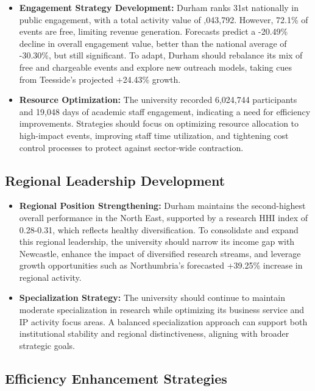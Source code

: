 \documentclass[journal,onecolumn, 10pt,draftclsnofoot]{IEEEtran}
\begin{document}
\begin{itemize}
    \item \textbf{Engagement Strategy Development:} Durham ranks 31st nationally in public engagement, with a total activity value of ,043,792. However, 72.1\% of events are free, limiting revenue generation. Forecasts predict a -20.49\% decline in overall engagement value, better than the national average of -30.30\%, but still significant. To adapt, Durham should rebalance its mix of free and chargeable events and explore new outreach models, taking cues from Teesside's projected +24.43\% growth.
    
    \item \textbf{Resource Optimization:} The university recorded 6,024,744 participants and 19,048 days of academic staff engagement, indicating a need for efficiency improvements. Strategies should focus on optimizing resource allocation to high-impact events, improving staff time utilization, and tightening cost control processes to protect against sector-wide contraction.
\end{itemize}

\subsection{Regional Leadership Development}

\begin{itemize}
    \item \textbf{Regional Position Strengthening:} Durham maintains the second-highest overall performance in the North East, supported by a research HHI index of 0.28-0.31, which reflects healthy diversification. To consolidate and expand this regional leadership, the university should narrow its income gap with Newcastle, enhance the impact of diversified research streams, and leverage growth opportunities such as Northumbria's forecasted +39.25\% increase in regional activity.
    
    \item \textbf{Specialization Strategy:} The university should continue to maintain moderate specialization in research while optimizing its business service and IP activity focus areas. A balanced specialization approach can support both institutional stability and regional distinctiveness, aligning with broader strategic goals.
\end{itemize}

\subsection{Efficiency Enhancement Strategies}
\end{document}
